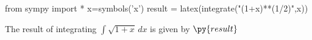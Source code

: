 \documentclass[11pt]{article}%
\begin{document}
\begin{pyconsole}
from sympy import *
x=symbols('x')
result = latex(integrate("(1+x)**(1/2)",x))
\end{pyconsole}
 
The result of integrating $\int \sqrt{ 1+x } \, dx$ is given by $\py{result}$
\end{document}
